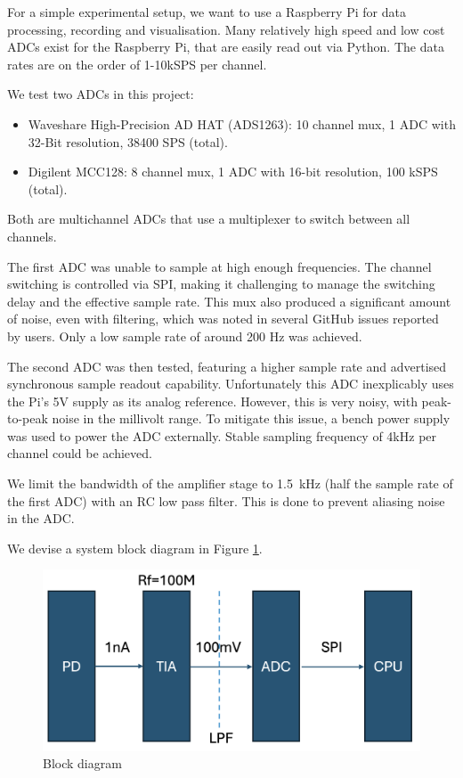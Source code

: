For a simple experimental setup, we want to use a Raspberry Pi for data processing, recording and visualisation. Many relatively high speed and low cost ADCs exist for the Raspberry Pi, that are easily read out via Python. The data rates are on the order of 1-10kSPS per channel.

We test two ADCs in this project:
\begin{itemize}
  \item Waveshare High-Precision AD HAT (ADS1263): 10 channel mux, 1 ADC with 32-Bit resolution, 38400 SPS (total).
  \item Digilent MCC128: 8 channel mux, 1 ADC with 16-bit resolution, 100 kSPS (total).
\end{itemize}
Both are multichannel ADCs that use a multiplexer to switch between all channels. 

The first ADC was unable to sample at high enough frequencies. The channel switching is controlled via SPI, making it challenging to manage the switching delay and the effective sample rate. This mux also produced a significant amount of noise, even with filtering, which was noted in several GitHub issues reported by users. Only a low sample rate of around 200 Hz was achieved.

The second ADC was then tested, featuring a higher sample rate and advertised synchronous sample readout capability. Unfortunately this ADC inexplicably uses the Pi's 5V supply as its analog reference. However, this is very noisy, with peak-to-peak noise in the millivolt range. To mitigate this issue, a bench power supply was used to power the ADC externally. Stable sampling frequency of 4kHz per channel could be achieved.

We limit the bandwidth of the amplifier stage to 1.5~kHz (half the sample rate of the first ADC) with an RC low pass filter. This is done to prevent aliasing noise in the ADC.

We devise a system block diagram in Figure \ref{fig:block}.

\begin{figure}[t]
  \centering
  \includegraphics[width=\widthnarrow]{figures/impl/block_diagram.png}
  \caption{Block diagram}
  \label{fig:block}
\end{figure}

